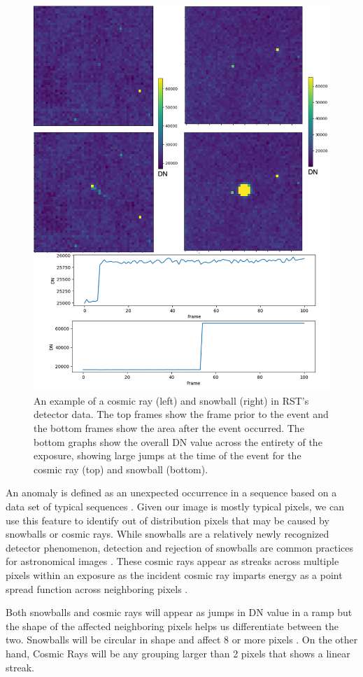 \begin{figure}[h]
    \centering
    \includegraphics[width=.75\linewidth]{figs/5/Examples_fixed.png}
    \caption{An example of a cosmic ray (left) and snowball (right) in RST's detector data. The top frames show the frame prior to the event and the bottom frames show the area after the event occurred. The bottom graphs show the overall DN value across the entirety of the exposure, showing large jumps at the time of the event for the cosmic ray (top) and snowball (bottom).}
    \label{chap5/fig:anomalies}
\end{figure}

An anomaly is defined as an unexpected occurrence in a sequence based on a data set of typical sequences \cite{horton2021integrating}. 
Given our image is mostly typical pixels, we can use this feature to identify out of distribution pixels that may be caused by snowballs or cosmic rays. 
While snowballs are a relatively newly recognized detector phenomenon, detection and rejection of snowballs are common practices for astronomical images \cite{van2001cosmic}.
These cosmic rays appear as streaks across multiple pixels within an exposure as the incident cosmic ray imparts energy as a point spread function across neighboring pixels \cite{pych2003fast}.

Both snowballs and cosmic rays will appear as jumps in DN value in a ramp but the shape of the affected neighboring pixels helps us differentiate between the two.
Snowballs will be circular in shape and affect 8 or more pixels \cite{cillis2018snowballs}.
On the other hand, Cosmic Rays will be any grouping larger than 2 pixels that shows a linear streak. 

